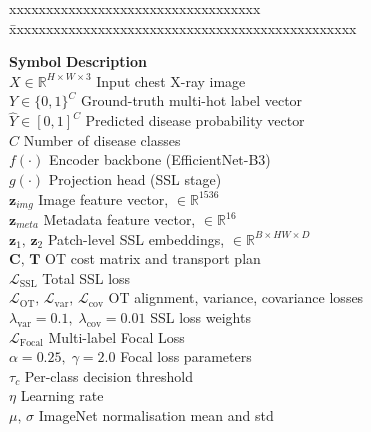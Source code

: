 \documentclass[BTech]{iiitdmdiss}
\begin{document}
\notation
\noindent
\begin{tabbing}
xxxxxxxxxxxxxxxxxxxxxxxxxxxxxxxxxx \= xxxxxxxxxxxxxxxxxxxxxxxxxxxxxxxxxxxxxxxxxxxxxxx \kill

\textbf{Symbol} \> \textbf{Description}\\[0.4em]

$X \in \mathbb{R}^{H \times W \times 3}$    \> Input chest X-ray image\\
$Y \in \{0,1\}^{C}$                         \> Ground-truth multi-hot label vector\\
$\hat{Y} \in [0,1]^{C}$                     \> Predicted disease probability vector\\
$C$                                          \> Number of disease classes\\
$f(\cdot)$                                   \> Encoder backbone (EfficientNet-B3)\\
$g(\cdot)$                                   \> Projection head (SSL stage)\\
$\mathbf{z}_{img}$                           \> Image feature vector, $\in \mathbb{R}^{1536}$\\
$\mathbf{z}_{meta}$                          \> Metadata feature vector, $\in \mathbb{R}^{16}$\\
$\mathbf{z}_1,\, \mathbf{z}_2$              \> Patch-level SSL embeddings, $\in \mathbb{R}^{B \times HW \times D}$\\
$\mathbf{C},\, \mathbf{T}$                  \> OT cost matrix and transport plan\\
$\mathcal{L}_{\text{SSL}}$                   \> Total SSL loss\\
$\mathcal{L}_{\text{OT}},\, \mathcal{L}_{\text{var}},\, \mathcal{L}_{\text{cov}}$ \> OT alignment, variance, covariance losses\\
$\lambda_{\text{var}} = 0.1,\; \lambda_{\text{cov}} = 0.01$ \> SSL loss weights\\
$\mathcal{L}_{\text{Focal}}$                 \> Multi-label Focal Loss\\
$\alpha = 0.25,\; \gamma = 2.0$             \> Focal loss parameters\\
$\tau_c$                                     \> Per-class decision threshold\\
$\eta$                                       \> Learning rate\\
$\mu,\, \sigma$                              \> ImageNet normalisation mean and std\\

\end{tabbing}
\end{document}
